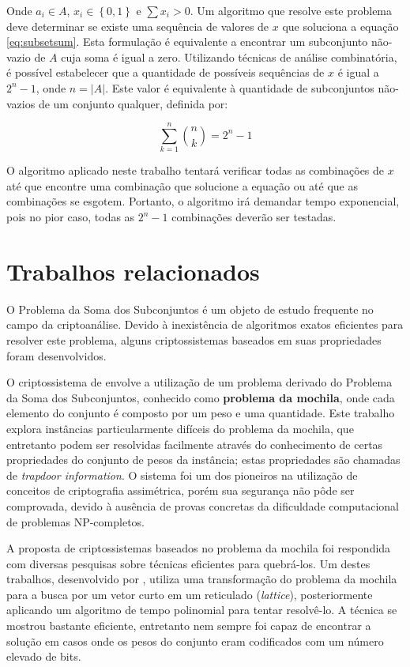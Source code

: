 \documentclass[12pt]{article}
\begin{document}
Onde $a_{i} \in A$, $x_{i} \in \left\{0, 1\right\}$ e $\sum x_{i} > 0$. Um algoritmo que resolve este problema deve determinar se existe uma sequência de valores de $x$ que soluciona a equação \ref{eq:subsetsum}. Esta formulação é equivalente a encontrar um subconjunto não-vazio de $A$ cuja soma é igual a zero. Utilizando técnicas de análise combinatória, é possível estabelecer que a quantidade de possíveis sequências de $x$ é igual a $2^{n} - 1$, onde $n = \left | A \right |$. Este valor é equivalente à quantidade de subconjuntos não-vazios de um conjunto qualquer, definida por:

\begin{equation} \label{eq:subsetcount}
    \sum_{k = 1}^{n} \binom{n}{k} = 2^{n} - 1
\end{equation}

O algoritmo aplicado neste trabalho tentará verificar todas as combinações de $x$ até que encontre uma combinação que solucione a equação ou até que as combinações se esgotem. Portanto, o algoritmo irá demandar tempo exponencial, pois no pior caso, todas as $2^{n} - 1$ combinações deverão ser testadas.

\section{Trabalhos relacionados} \label{sec:relatedwork}

O Problema da Soma dos Subconjuntos é um objeto de estudo frequente no campo da criptoanálise. Devido à inexistência de algoritmos exatos eficientes para resolver este problema, alguns criptossistemas baseados em suas propriedades foram desenvolvidos.

O criptossistema de \cite{Merkle1978} envolve a utilização de um problema derivado do Problema da Soma dos Subconjuntos, conhecido como \textbf{problema da mochila}, onde cada elemento do conjunto é composto por um peso e uma quantidade. Este trabalho explora instâncias particularmente difíceis do problema da mochila, que entretanto podem ser resolvidas facilmente através do conhecimento de certas propriedades do conjunto de pesos da instância; estas propriedades são chamadas de \textit{trapdoor information}. O sistema foi um dos pioneiros na utilização de conceitos de criptografia assimétrica, porém sua segurança não pôde ser comprovada, devido à ausência de provas concretas da dificuldade computacional de problemas NP-completos.

A proposta de criptossistemas baseados no problema da mochila foi respondida com diversas pesquisas sobre técnicas eficientes para quebrá-los. Um destes trabalhos, desenvolvido por \cite{Lagarias1985}, utiliza uma transformação do problema da mochila para a busca por um vetor curto em um reticulado (\textit{lattice}), posteriormente aplicando um algoritmo de tempo polinomial para tentar resolvê-lo. A técnica se mostrou bastante eficiente, entretanto nem sempre foi capaz de encontrar a solução em casos onde os pesos do conjunto eram codificados com um número elevado de bits.
\end{document}
